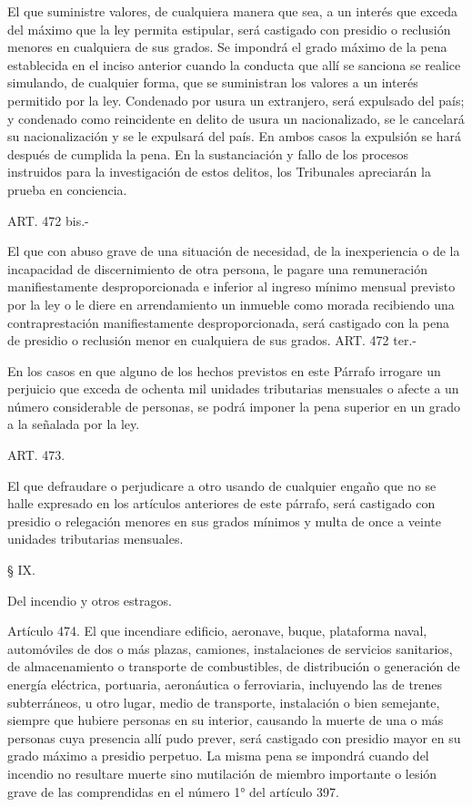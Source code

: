     El que suministre valores, de cualquiera manera que sea, a un interés que exceda del máximo que la ley permita estipular, será castigado con presidio o reclusión menores en cualquiera de sus grados.
    Se impondrá el grado máximo de la pena establecida en el inciso anterior cuando la conducta que allí se sanciona se realice simulando, de cualquier forma, que se suministran los valores a un interés permitido por la ley.
    Condenado por usura un extranjero, será expulsado del país; y condenado como reincidente en delito de usura un nacionalizado, se le cancelará su nacionalización y se le expulsará del país.
    En ambos casos la expulsión se hará después de cumplida la pena.
    En la sustanciación y fallo de los procesos instruidos para la investigación de estos delitos, los Tribunales apreciarán la prueba en conciencia.




    ART. 472 bis.-

    El que con abuso grave de una situación de necesidad, de la inexperiencia o de la incapacidad de discernimiento de otra persona, le pagare una remuneración manifiestamente desproporcionada e inferior al ingreso mínimo mensual previsto por la ley o le diere en arrendamiento un inmueble como morada recibiendo una contraprestación manifiestamente desproporcionada, será castigado con la pena de presidio o reclusión menor en cualquiera de sus grados.
    ART. 472 ter.-

    En los casos en que alguno de los hechos previstos en este Párrafo irrogare un perjuicio que exceda de ochenta mil unidades tributarias mensuales o afecte a un número considerable de personas, se podrá imponer la pena superior en un grado a la señalada por la ley.

    ART. 473.

    El que defraudare o perjudicare a otro usando de cualquier engaño que no se halle expresado en los artículos anteriores de este párrafo, será castigado con presidio o relegación menores en sus grados mínimos y multa de once a veinte unidades tributarias mensuales.








    § IX.

    Del incendio y otros estragos.





    Artículo 474. El que incendiare edificio, aeronave, buque, plataforma naval, automóviles de dos o más plazas, camiones, instalaciones de servicios sanitarios, de almacenamiento o transporte de combustibles, de distribución o generación de energía eléctrica, portuaria, aeronáutica o ferroviaria, incluyendo las de trenes subterráneos, u otro lugar, medio de transporte, instalación o bien semejante, siempre que hubiere personas en su interior, causando la muerte de una o más personas cuya presencia allí pudo prever, será castigado con presidio mayor en su grado máximo a presidio perpetuo.
    La misma pena se impondrá cuando del incendio no resultare muerte sino mutilación de miembro importante o lesión grave de las comprendidas en el número 1° del artículo 397.



